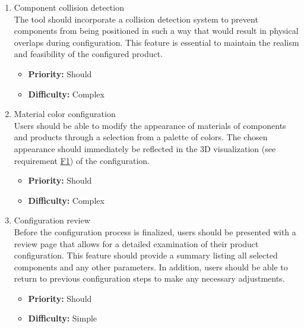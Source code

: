 \begin{enumerate}[label=\textbf{F\arabic*:}, leftmargin=*]
\item \label{itm:F7} Component collision detection
\vspace{2pt}
\\The tool should incorporate a collision detection system to prevent components from being positioned in such a way that would result in physical overlaps during configuration. This feature is essential to maintain \phantom{the realism and feasibility of the configured product.}\newpage the realism and feasibility of the configured product.
\begin{itemize}[noitemsep, label=\trianglebullet]
    \item \textbf{Priority:} Should
    \item \textbf{Difficulty:} Complex
\end{itemize}
\vspace{4pt}

\item \label{itm:F8} Material color configuration
\vspace{2pt}
\\Users should be able to modify the appearance of materials of components and products through a selection from a palette of colors. The chosen appearance should immediately be reflected in the 3D visualization (see requirement \hyperref[itm:F1]{F1}) of the configuration.
\begin{itemize}[noitemsep, label=\trianglebullet]
    \item \textbf{Priority:} Should
    \item \textbf{Difficulty:} Complex
\end{itemize}
\vspace{4pt}

\item \label{itm:F9} Configuration review
\vspace{2pt}
\\Before the configuration process is finalized, users should be presented with a review page that allows for a detailed examination of their product configuration. This feature should provide a summary listing all selected components and any other parameters. In addition, users should be able to return to previous configuration steps to make any necessary adjustments.
\begin{itemize}[noitemsep, label=\trianglebullet]
    \item \textbf{Priority:} Should
    \item \textbf{Difficulty:} Simple
\end{itemize}
\vspace{4pt}


\end{enumerate}
